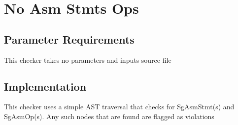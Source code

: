 
\section{No Asm Stmts Ops}
\label{NoAsmStmtsOps::overview}


\subsection{Parameter Requirements}
This checker takes no parameters and inputs source file

\subsection{Implementation}
This checker uses a simple AST traversal that checks for SgAsmStmt(s) and SgAsmOp(s). Any such nodes that are found are flagged as violations

